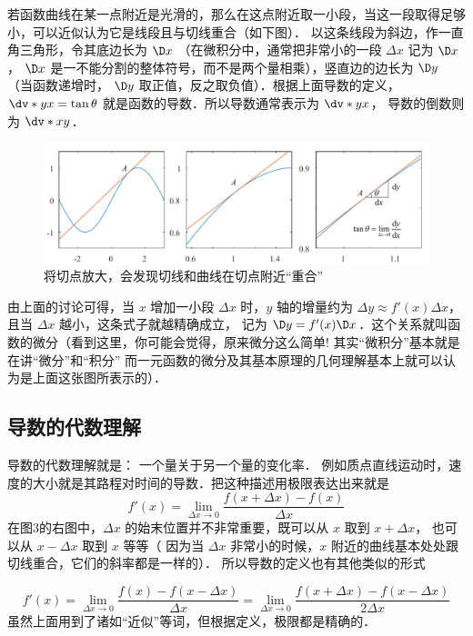 若函数曲线在某一点附近是光滑的，那么在这点附近取一小段，当这一段取得足够小，可以近似认为它是线段且与切线重合（如下图）． 以这条线段为斜边，作一直角三角形，令其底边长为 $\D x$ （在微积分中，通常把非常小的一段 $\Delta x$ 记为 $\D x$，  $\D x$ 是一不能分割的整体符号，而不是两个量相乘），竖直边的边长为 $\D y$ （当函数递增时， $\D y$ 取正值，反之取负值）．根据上面导数的定义，$\dv*{y}{x} = \tan \theta $ 就是函数的导数．所以导数通常表示为 $\dv*{y}{x}$， 导数的倒数则为 $\dv*{x}{y}$． 

\begin{figure}[ht]
\centering
\includegraphics[width=14cm]{./figures/Der2.pdf}
\caption{将切点放大，会发现切线和曲线在切点附近“重合”}
\end{figure}

由上面的讨论可得，当 $x$ 增加一小段 $\Delta x$ 时，$y$ 轴的增量约为 $\Delta y \approx f'\left( x \right)\Delta x$，且当 $\Delta x$ 越小，这条式子就越精确成立， 记为 $\D y = f'(x)\D x$．这个关系就叫函数的微分（看到这里，你可能会觉得，原来微分这么简单! 其实“微积分”基本就是在讲“微分”和“积分” 而一元函数的微分及其基本原理的几何理解基本上就可以认为是上面这张图所表示的）．


\subsection{导数的代数理解}

导数的代数理解就是： 一个量关于另一个量的变化率． 例如质点直线运动时，速度的大小就是其路程对时间的导数．把这种描述用极限表达出来就是
\begin{equation}\label{Der_eq2}
f'\left( x \right) = \mathop {\lim }\limits_{\Delta x \to 0} \frac{f\left( {x + \Delta x} \right) - f\left( x \right)}{\Delta x}
\end{equation}
在图3的右图中，$\Delta x$ 的始末位置并不非常重要，既可以从 $x$ 取到 $x + \Delta x$， 也可以从 $x - \Delta x$  取到 $x$ 等等（ 因为当 $\Delta x$ 非常小的时候，$x$ 附近的曲线基本处处跟切线重合，它们的斜率都是一样的）． 所以导数的定义也有其他类似的形式

\begin{equation}
f'\left( x \right) = \mathop {\lim }\limits_{\Delta x \to 0} \frac{f\left( x \right) - f\left( {x - \Delta x} \right)}{\Delta x} = \mathop {\lim }\limits_{\Delta x \to 0} \frac{f\left( {x + \Delta x} \right) - f\left( {x - \Delta x} \right)}{2\Delta x}
\end{equation}
虽然上面用到了诸如“近似”等词，但根据定义，极限都是精确的．



